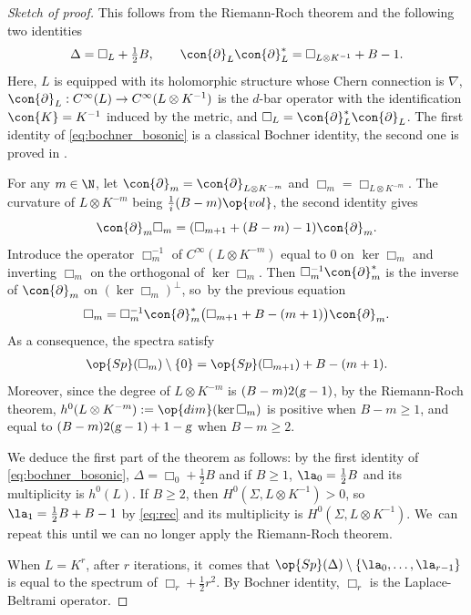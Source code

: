\begin{proof}[Sketch of proof] This follows from the Riemann-Roch theorem and the
following two identities
\begin{gather} \label{eq:bochner_bosonic}
\Delta = \Box_L + \tfrac{1}{2} B, \qquad \con{\partial}_L
\con{\partial}_L^* = \Box_{L \otimes K^{-1}} +B -1.
\end{gather}
Here, $L$ is equipped with its holomorphic structure whose Chern connection
is $\nabla$, $\con{\partial}_L: C^{\infty} (L)
\rightarrow C^{\infty} (L \otimes K^{-1})$ is the $d$-bar
operator with the identification $\con{ K} = K^{-1}$ induced by
the metric, and $\Box_L = \con{\partial}_L^*
\con{\partial}_L$. The first identity of \eqref{eq:bochner_bosonic} is a
classical Bochner identity, the second one is proved in \cite[Th.\,7.1]{Landau1}.

For any $m \in \N$, let $\con{\partial}_m = \con{\partial}_{L \otimes
K^{-m}}$ and $\Box_m = \Box_{L \otimes K^{-m}}$. The curvature of $L
\otimes K^{-m}$ being $\frac{1}{i} (B -m) \op{vol}$, the second identity
gives
\[
\con{\partial}_m \Box_m = (
\Box_{m+1} + (B - m) - 1) \con{\partial}_m.\]
Introduce the operator $\Box_{m}^{-1}$
of $C^\infty(L \otimes K^{-m})$ equal to $0$ on $\ker \Box_m$
and inverting $\Box_m$ on the orthogonal of $\ker \Box_m$. Then
$\Box_m^{-1} \con{\partial}_m^*$ is the inverse of $\con{\partial}_m$ on
$(\ker \Box_m)^{\perp}$, so~by the previous equation
\begin{gather*}
\Box_m = \Box_m^{-1} \con{\partial}_m^* \bigl(\Box_{m+1} + B - (m+1)
\bigr) \con{\partial}_m.
\end{gather*}
As a consequence, the spectra satisfy
\begin{gather} \label{eq:rec}
\op{Sp} (\Box_m) \setminus \{ 0 \} = \op{Sp} (
\Box_{m+1}) + B - (m +1).
\end{gather}
Moreover, since the degree of $L \otimes K^{-m}$ is $(B- m) 2 (\textsl{g} -1)$, by
the Riemann-Roch theorem, $h^0 (L \otimes K^{-m}) := \op{dim} (\ker \Box_m)$ is
positive when $B - m \geqslant 1$, and equal to $(B-m) 2 (\textsl{g}-1) + 1 - \textsl{g}$ when
$B- m \geqslant 2 $.

We deduce the first part of the theorem as follows: by the first identity of
\eqref{eq:bochner_bosonic}, $\Delta = \Box_0 + \frac{1}{2} B$ and if $B
\geqslant 1$, $\la_0 = \tfrac{1}{2} B$ and its multiplicity is $h^0 (
L)$. If $B\geqslant 2$, then $H^{0} (\Sigma, L \otimes K^{-1}) >0$, so
$\la_1 =\frac{1}{2}B + B -1$ by \eqref{eq:rec} and its multiplicity is $H^{0}
(\Sigma, L \otimes K^{-1})$. We~can repeat this until we can no longer apply the Riemann-Roch theorem.

When $L = K^r$, after $r$ iterations, it~comes that $\op{Sp}(\Delta) \setminus \{ \la_0, \ldots, \la_{r-1} \}$
is equal to the spectrum of $\Box_r + \frac{1}{2} r^2$. By Bochner identity,
$\Box_r$ is the Laplace-Beltrami operator.
\end{proof}

